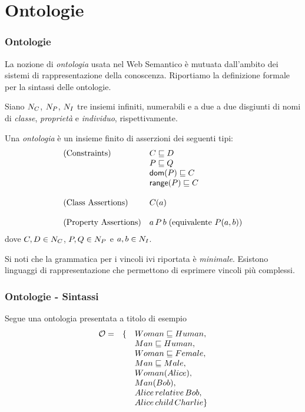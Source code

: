 \documentclass[8pt]{beamer}
\begin{document}
\section{Ontologie}

\begin{frame}
 \frametitle{Ontologie}
 
 La nozione di \emph{ontologia} usata nel Web Semantico \`e mutuata
 dall'ambito dei sistemi di rappresentazione della conoscenza.
Riportiamo la definizione formale per la sintassi delle ontologie.
\vspace{\baselineskip}

Siano $N_C$, $N_P$, $N_I$ tre insiemi infiniti, numerabili e 
a due a due disgiunti di nomi di \emph{classe}, \emph{propriet\`a} e \emph{individuo},
rispettivamente.
\vspace{\baselineskip}

Una \emph{ontologia} \`e un insieme finito di asserzioni dei seguenti tipi:
\[
 \begin{array}{ll}
  \mbox{(Constraints)} & C \sqsubseteq D\\
  & P \sqsubseteq Q \\
  & \mathsf{dom}(P) \sqsubseteq C \\
  & \mathsf{range}(P) \sqsubseteq C \\
  &\\
  \mbox{(Class Assertions)} & C(a)\\
  &\\
  \mbox{(Property Assertions)} & a\,P\,b\;(\mbox{equivalente }P(a,b))\\
 \end{array}
\]
dove $C, D \in N_C$, $P, Q \in N_P$ e $a, b \in N_I$.
\vspace{\baselineskip}

Si noti che la grammatica per i vincoli ivi riportata \`e \emph{minimale}.
Esistono linguaggi di rappresentazione che permettono di esprimere vincoli
pi\`u complessi.
\end{frame}

\begin{frame}
\frametitle{Ontologie - Sintassi}

 Segue una ontologia presentata a titolo di esempio
\[
\begin{array}{ccl}
 \mathcal{O} = & \{ & Woman \sqsubseteq Human, \\
 &&Man \sqsubseteq Human, \\
 &&Woman \sqsubseteq Female, \\
 &&Man \sqsubseteq Male, \\
 &&Woman(Alice), \\
 &&Man(Bob),\\
 &&Alice\,relative\,Bob,\\ 
 &&Alice\,child\,Charlie \}
\end{array} 
\]
\end{frame}
\end{document}
